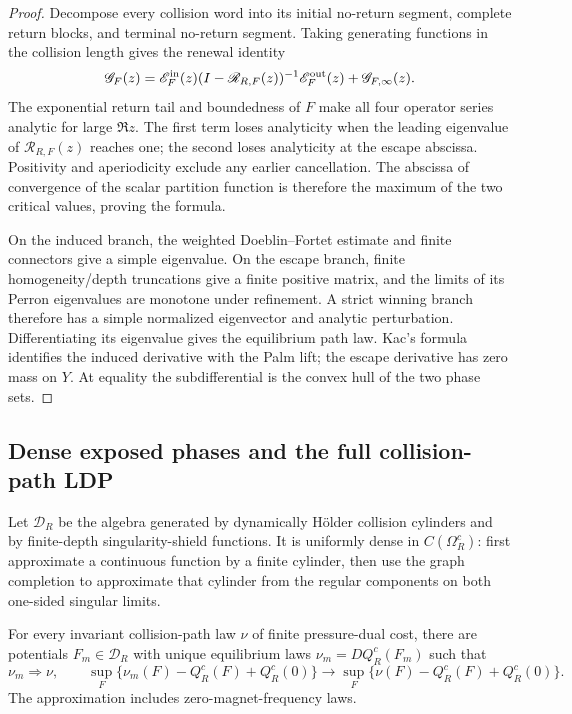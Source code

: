 \begin{proof}
Decompose every collision word into its initial no-return segment, complete
return blocks, and terminal no-return segment.  Taking generating functions in
the collision length gives the renewal identity
\[
 \mathscr G_F(z)=
 \mathscr E_F^{\rm in}(z)
 (I-\mathscr R_{R,F}(z))^{-1}
 \mathscr E_F^{\rm out}(z)+\mathscr G_{F,\infty}(z).
\]
The exponential return tail and boundedness of \(F\) make all four operator
series analytic for large \(\Re z\).  The first term loses analyticity when
the leading eigenvalue of \(\mathscr R_{R,F}(z)\) reaches one; the second loses
analyticity at the escape abscissa.  Positivity and aperiodicity exclude any
earlier cancellation.  The abscissa of convergence of the scalar partition
function is therefore the maximum of the two critical values, proving the
formula.

On the induced branch, the weighted Doeblin--Fortet estimate and finite
connectors give a simple eigenvalue.  On the escape branch, finite
homogeneity/depth truncations give a finite positive matrix, and the limits of
its Perron eigenvalues are monotone under refinement.  A strict winning branch
therefore has a simple normalized eigenvector and analytic perturbation.
Differentiating its eigenvalue gives the equilibrium path law.  Kac's formula
identifies the induced derivative with the Palm lift; the escape derivative
has zero mass on \(Y\).  At equality the subdifferential is the convex hull of
the two phase sets.
\end{proof}

\subsection{Dense exposed phases and the full collision-path LDP}

Let \(\mathscr D_R\) be the algebra generated by dynamically H\"older
collision cylinders and by finite-depth singularity-shield functions.  It is
uniformly dense in \(C(\Omega_R^c)\): first approximate a continuous function
by a finite cylinder, then use the graph completion to approximate that
cylinder from the regular components on both one-sided singular limits.

\begin{lemma}
\label{lem:r3-a3-exposed}
For every invariant collision-path law \(\nu\) of finite pressure-dual cost,
there are potentials \(F_m\in\mathscr D_R\) with unique equilibrium laws
\(\nu_m=DQ_R^c(F_m)\) such that
\[
 \nu_m\Longrightarrow\nu,
 \qquad
 \sup_F\{\nu_m(F)-Q_R^c(F)+Q_R^c(0)\}
 \longrightarrow
 \sup_F\{\nu(F)-Q_R^c(F)+Q_R^c(0)\}.
\]
The approximation includes zero-magnet-frequency laws.
\end{lemma}


